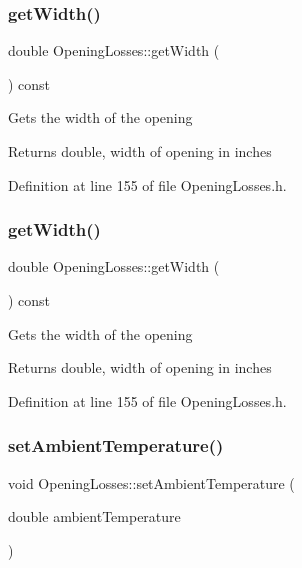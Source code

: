 \subsubsection{\texorpdfstring{get\+Width()}{getWidth()}\hspace{0.1cm}{\footnotesize\ttfamily [2/3]}}
{\footnotesize\ttfamily double Opening\+Losses\+::get\+Width (\begin{DoxyParamCaption}{ }\end{DoxyParamCaption}) const\hspace{0.3cm}{\ttfamily [inline]}}

Gets the width of the opening \begin{DoxyReturn}{Returns}
double, width of opening in inches 
\end{DoxyReturn}


Definition at line 155 of file Opening\+Losses.\+h.

\mbox{\label{class_opening_losses_a0374aeac5532188358b5f6ad0f120305}} 
\subsubsection{\texorpdfstring{get\+Width()}{getWidth()}\hspace{0.1cm}{\footnotesize\ttfamily [3/3]}}
{\footnotesize\ttfamily double Opening\+Losses\+::get\+Width (\begin{DoxyParamCaption}{ }\end{DoxyParamCaption}) const\hspace{0.3cm}{\ttfamily [inline]}}

Gets the width of the opening \begin{DoxyReturn}{Returns}
double, width of opening in inches 
\end{DoxyReturn}


Definition at line 155 of file Opening\+Losses.\+h.

\mbox{\label{class_opening_losses_a3624c9fad2a413871b7324f7e957a5ae}} 
\subsubsection{\texorpdfstring{set\+Ambient\+Temperature()}{setAmbientTemperature()}\hspace{0.1cm}{\footnotesize\ttfamily [1/3]}}
{\footnotesize\ttfamily void Opening\+Losses\+::set\+Ambient\+Temperature (\begin{DoxyParamCaption}\item[{double}]{ambient\+Temperature }\end{DoxyParamCaption})\hspace{0.3cm}{\ttfamily [inline]}}

